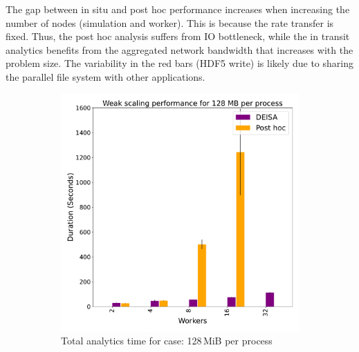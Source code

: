 The gap between in situ and post hoc performance increases when increasing the number of nodes (simulation and \dask worker). This is because the rate transfer is fixed. Thus, the post hoc analysis suffers from IO bottleneck, while the in transit analytics benefits from the aggregated network bandwidth that increases with the problem size.    
The variability in the red bars (HDF5 write) is likely due to sharing the parallel file system with other applications.

\begin{figure}
     \centering
     \begin{subfigure}[b]{0.3\textwidth}
         \centering
         \includegraphics[width=\textwidth, height=\textwidth]{figures/128A.pdf}
         \caption{Total analytics time for case: 128\,MiB per process}
         \label{fig:A128}
     \end{subfigure}
     \hfill
     \begin{subfigure}[b]{0.3\textwidth}
         \centering

\end{subfigure}
\end{figure}

